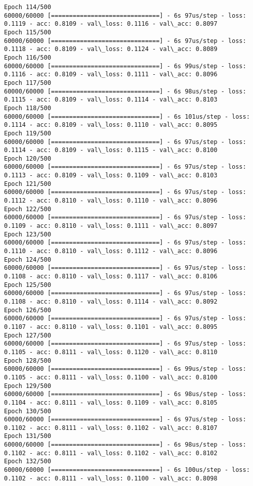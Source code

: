 \documentclass[11pt]{article}
\begin{document}
\begin{Verbatim}[commandchars=\\\{\}]
Epoch 114/500
60000/60000 [==============================] - 6s 97us/step - loss: 0.1119 - acc: 0.8109 - val\_loss: 0.1116 - val\_acc: 0.8097
Epoch 115/500
60000/60000 [==============================] - 6s 97us/step - loss: 0.1118 - acc: 0.8109 - val\_loss: 0.1124 - val\_acc: 0.8089
Epoch 116/500
60000/60000 [==============================] - 6s 99us/step - loss: 0.1116 - acc: 0.8109 - val\_loss: 0.1111 - val\_acc: 0.8096
Epoch 117/500
60000/60000 [==============================] - 6s 98us/step - loss: 0.1115 - acc: 0.8109 - val\_loss: 0.1114 - val\_acc: 0.8103
Epoch 118/500
60000/60000 [==============================] - 6s 101us/step - loss: 0.1114 - acc: 0.8109 - val\_loss: 0.1110 - val\_acc: 0.8095
Epoch 119/500
60000/60000 [==============================] - 6s 97us/step - loss: 0.1114 - acc: 0.8109 - val\_loss: 0.1115 - val\_acc: 0.8100
Epoch 120/500
60000/60000 [==============================] - 6s 97us/step - loss: 0.1113 - acc: 0.8109 - val\_loss: 0.1109 - val\_acc: 0.8103
Epoch 121/500
60000/60000 [==============================] - 6s 97us/step - loss: 0.1112 - acc: 0.8110 - val\_loss: 0.1110 - val\_acc: 0.8096
Epoch 122/500
60000/60000 [==============================] - 6s 97us/step - loss: 0.1109 - acc: 0.8110 - val\_loss: 0.1111 - val\_acc: 0.8097
Epoch 123/500
60000/60000 [==============================] - 6s 97us/step - loss: 0.1110 - acc: 0.8110 - val\_loss: 0.1112 - val\_acc: 0.8096
Epoch 124/500
60000/60000 [==============================] - 6s 97us/step - loss: 0.1108 - acc: 0.8110 - val\_loss: 0.1117 - val\_acc: 0.8106
Epoch 125/500
60000/60000 [==============================] - 6s 97us/step - loss: 0.1108 - acc: 0.8110 - val\_loss: 0.1114 - val\_acc: 0.8092
Epoch 126/500
60000/60000 [==============================] - 6s 97us/step - loss: 0.1107 - acc: 0.8110 - val\_loss: 0.1101 - val\_acc: 0.8095
Epoch 127/500
60000/60000 [==============================] - 6s 97us/step - loss: 0.1105 - acc: 0.8111 - val\_loss: 0.1120 - val\_acc: 0.8110
Epoch 128/500
60000/60000 [==============================] - 6s 99us/step - loss: 0.1105 - acc: 0.8111 - val\_loss: 0.1100 - val\_acc: 0.8100
Epoch 129/500
60000/60000 [==============================] - 6s 98us/step - loss: 0.1104 - acc: 0.8111 - val\_loss: 0.1109 - val\_acc: 0.8105
Epoch 130/500
60000/60000 [==============================] - 6s 97us/step - loss: 0.1102 - acc: 0.8111 - val\_loss: 0.1102 - val\_acc: 0.8107
Epoch 131/500
60000/60000 [==============================] - 6s 98us/step - loss: 0.1102 - acc: 0.8111 - val\_loss: 0.1102 - val\_acc: 0.8102
Epoch 132/500
60000/60000 [==============================] - 6s 100us/step - loss: 0.1102 - acc: 0.8111 - val\_loss: 0.1100 - val\_acc: 0.8098

\end{Verbatim}
\end{document}
